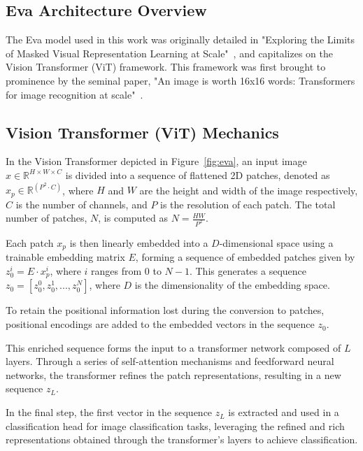 \documentclass[a4paper,12pt,openright]{book}
\begin{document}
\subsection{Eva Architecture Overview}
\label{subsec:eva_architecture}

The Eva model used in this work was originally detailed in "Exploring the Limits of Masked Visual Representation Learning at Scale"~\cite{fang2022eva}, and capitalizes on the Vision Transformer (ViT) framework. This framework was first brought to prominence by the seminal paper, "An image is worth 16x16 words: Transformers for image recognition at scale"~\cite{DBLP:journals/corr/abs-2010-11929}.





\subsection{Vision Transformer (ViT) Mechanics}
\label{subsec:vit_mechanics}
In the Vision Transformer depicted in Figure~\ref{fig:eva}, an input image \( x \in \mathbb{R}^{H \times W \times C} \) is divided into a sequence of flattened 2D patches, denoted as \( x_p \in \mathbb{R}^{(P^2 \cdot C)} \), where \(H\) and \(W\) are the height and width of the image respectively, \(C\) is the number of channels, and \(P\) is the resolution of each patch. The total number of patches, \(N\), is computed as \( N = \frac{HW}{P^2} \).

Each patch \( x_p \) is then linearly embedded into a \(D\)-dimensional space using a trainable embedding matrix \(E\), forming a sequence of embedded patches given by \( z_0^i = E \cdot x_p^i \), where \(i\) ranges from 0 to \(N-1\). This generates a sequence \( z_0 = [z_0^0, z_0^1, ..., z_0^N] \), where \(D\) is the dimensionality of the embedding space.

To retain the positional information lost during the conversion to patches, positional encodings are added to the embedded vectors in the sequence \( z_0 \).

This enriched sequence forms the input to a transformer network composed of \(L\) layers. Through a series of self-attention mechanisms and feedforward neural networks, the transformer refines the patch representations, resulting in a new sequence \( z_L \).

In the final step, the first vector in the sequence \( z_L \) is extracted and used in a classification head for image classification tasks, leveraging the refined and rich representations obtained through the transformer's layers to achieve classification.
\end{document}
